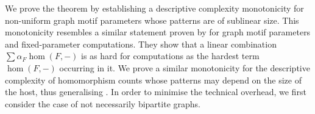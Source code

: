 \documentclass[10pt,a4paper]{article}
\theoremstyle{definition}
\theoremstyle{plain}
\theoremstyle{remark}
\begin{document}
	We prove the theorem by establishing a descriptive complexity monotonicity for non-uniform graph motif parameters whose patterns are of sublinear size. 
	This monotonicity resembles a similar statement proven by \textcite{curticapean_homomorphisms_2017}
	for graph motif parameters and fixed-parameter computations. 
	They show that a linear combination $\sum \alpha_F \hom(F, -)$ is as hard for  computations as the hardest term $\hom(F, -)$ occurring in it.
	We prove a similar monotonicity for the descriptive complexity of homomorphism counts whose patterns may depend on the size of the host, thus
	generalising \cite[Lemma~6]{seppelt_logical_2024}.
	In order to minimise the technical overhead,
	we first consider the case of not necessarily bipartite graphs.
	
	
	
	
\end{document}
